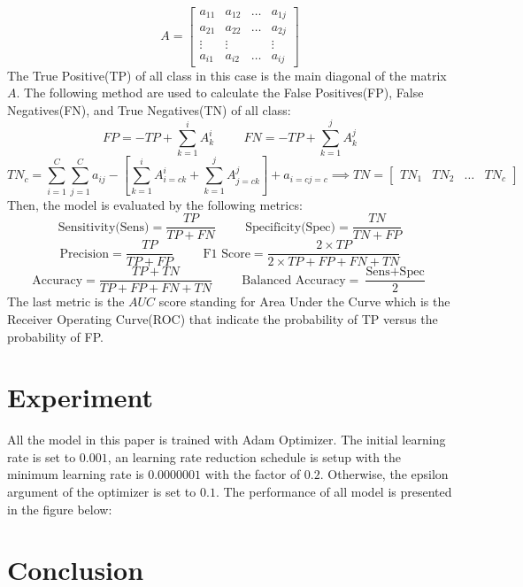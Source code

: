 \[
	A = \begin{bmatrix}
		a_{11} & a_{12} & \dots & a_{1j} \\
		a_{21} & a_{22} & \dots & a_{2j} \\
		\vdots & \vdots	&  & \vdots\\
		a_{i1} & a_{i2} & \dots & a_{ij} 
	\end{bmatrix}
\]
The True Positive(TP) of all class in this case is the main diagonal of the matrix $A$. The following method are used to calculate the False Positives(FP), False Negatives(FN), and True Negatives(TN) of all class:
\[
	FP = -TP + \sum_{k=1}^{i}A^i_k \hspace{1cm} FN = -TP + \sum_{k=1}^{j}A^j_k
\]
\[
	TN_c = \sum_{i=1}^{C}\sum_{j=1}^{C}a_{ij} - \left[ \sum_{k=1}^{i}A^i_{i=c k} + \sum_{k=1}^{j}A^j_{j=c k} \right] + a_{i=c j=c} \implies TN = \begin{bmatrix}
		TN_1 & TN_2 & \dots & TN_c
	\end{bmatrix}
\]
Then, the model is evaluated by the following metrics:
\[\text{Sensitivity(Sens)} = \frac{TP}{TP + FN} \hspace{1cm} \text{Specificity(Spec)} = \frac{TN}{TN + FP}\]
\[\text{Precision} = \frac{TP}{TP + FP} \hspace{1cm} \text{F1 Score} = \frac{2 \times TP}{2 \times TP + FP + FN + TN}\]
\[\text{Accuracy} = \frac{TP + TN}{TP + FP + FN + TN} \hspace{1cm} \text{Balanced Accuracy} = \frac{\text{Sens} + \text{Spec}}{2}\]
The last metric is the $AUC$ score standing for Area Under the Curve which is the Receiver Operating Curve(ROC) that indicate the probability of TP versus the probability of FP.  
\section{Experiment}
All the model in this paper is trained with Adam Optimizer\cite{6980}. The initial learning rate is set to $0.001$, an learning rate reduction schedule is setup with the minimum learning rate is $0.0000001$ with the factor of $0.2$. Otherwise, the epsilon argument of the optimizer is set to $0.1$. The performance of all model is presented in the figure below:
\section{Conclusion}
\clearpage
\pagebreak

